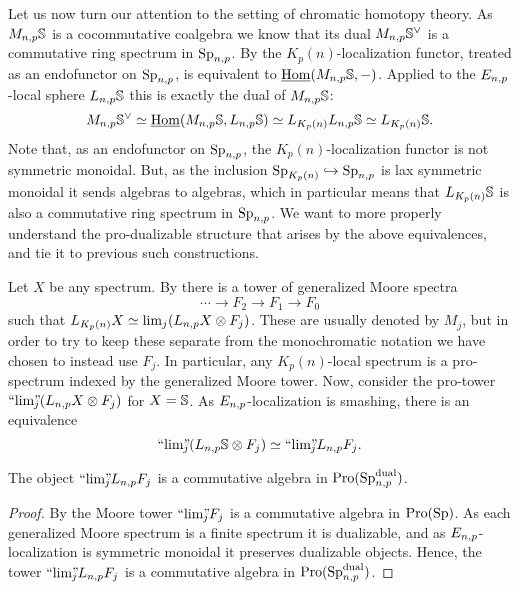Let us now turn our attention to the setting of chromatic homotopy theory. As $M\np\S$ is a cocommutative coalgebra we know that its dual $M\np\S^\vee$ is a commutative ring spectrum in $\Sp\np$. By \cite[2.21(4)]{barthel-heard-valenzuela_2018} the $K_p(n)$-localization functor, treated as an endofunctor on $\Sp\np$, is equivalent to $\iHom(M\np\S,-)$. Applied to the $E\np$-local sphere $L\np\S$ this is exactly the dual of $M\np\S$:
\[M\np \S^\vee \simeq \iHom(M\np\S, L\np\S)\simeq L_\Kpn L\np\S \simeq L_\Kpn\S.\]
Note that, as an endofunctor on $\Sp\np$, the $K_p(n)$-localization functor is not symmetric monoidal. But, as the inclusion $\Sp_\Kpn\hookrightarrow \Sp\np$ is lax symmetric monoidal it sends algebras to algebras, which in particular means that $L_\Kpn\S$ is also a commutative ring spectrum in $\Sp\np$. We want to more properly understand the pro-dualizable structure that arises by the above equivalences, and tie it to previous such constructions. 

Let $X$ be any spectrum. By \cite[7.10]{hovey-strickland_99} there is a tower of generalized Moore spectra 
\[\cdots \to F_2 \to F_1 \to F_0\]
such that $L_\Kpn X \simeq \lim_j (L\np X \otimes F_j)$. These are usually denoted by $M_j$, but in order to try to keep these separate from the monochromatic notation we have chosen to instead use $F_j$. In particular, any $K_p(n)$-local spectrum is a pro-spectrum indexed by the generalized Moore tower. Now, consider the pro-tower $\prolim (L\np X \otimes F_j)$ for $X=\S$. As $E\np$-localization is smashing, there is an equivalence 
\[\prolim (L\np \S \otimes F_j)\simeq \prolim L\np F_j.\]

\begin{lemma}
    \label{ch2:lm:Moore-tower-in-local-dualizable}
    The object $\prolim L\np F_j$ is a commutative algebra in $\Pro(\Sp\np\dual)$. 
\end{lemma}
\begin{proof}
    By \cite[6.3]{davis-lawson_2014} the Moore tower $\prolim F_j$ is a commutative algebra in $\Pro(\Sp)$. As each generalized Moore spectrum is a finite spectrum it is dualizable, and as $E\np$-localization is symmetric monoidal it preserves dualizable objects. Hence, the tower $\prolim L\np F_j$ is a commutative algebra in $\Pro(\Sp\np\dual)$. 
\end{proof}

